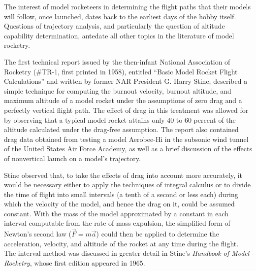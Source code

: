 \label{ch4:sec:intro}

The interest of model rocketeers in determining the flight paths that their models will follow,
once launched, dates back to the earliest days of the hobby itself. Questions of trajectory
analysis, and particularly the question of altitude capability determination, antedate all other
topics in the literature of model rocketry.

The first technical report issued by the then-infant National Association of Rocketry (\#TR-1,
first printed in 1958), entitled ``Basic Model Rocket Flight Calculations'' and written by former
NAR President G. Harry Stine, described a simple technique for computing the burnout velocity,
burnout altitude, and maximum altitude of a model rocket under the assumptions of zero drag and a
perfectly vertical flight path. The effect of drag in this treatment was allowed for by observing
that a typical model rocket attains only 40 to 60 percent of the altitude calculated under the
drag-free assumption. The report also contained drag data obtained from testing a model Aerobee-Hi
in the subsonic wind tunnel of the United States Air Force Academy, as well as a brief discussion
of the effects of nonvertical launch on a model's trajectory.

Stine observed that, to take the effects of drag into account more accurately, it would be
necessary either to apply the techniques of integral calculus or to divide the time of flight into
small intervals (a tenth of a second or less each) during which the velocity of the model, and
hence the drag on it, could be assumed constant. With the mass of the model approximated by a
constant in each interval computable from the rate of mass expulsion, the simplified form of
Newton's second law ($\vec{F} = m\vec{a}$) could then be applied to determine the acceleration,
velocity, and altitude of the rocket at any time during the flight. The interval method was
discussed in greater detail in Stine's \emph{Handbook of Model Rocketry}, whose first edition
appeared in 1965.

